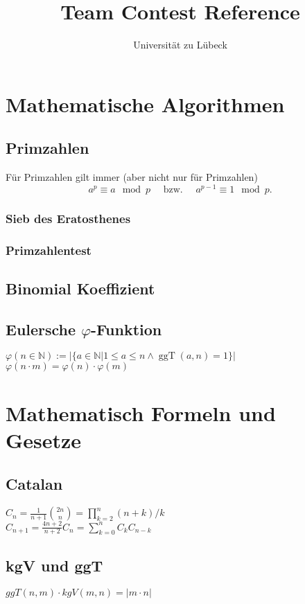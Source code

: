 \documentclass[10pt,a4paper,ngerman,oneside,
]{article}
\title{Team Contest Reference}
\author{Universität zu Lübeck}
\newcommand{\N}{\ensuremath{\mathbb{N}}}
\newcommand{\ggT}{\ensuremath{\operatorname{ggT}}}
\begin{document}
\lstset{basicstyle=\ttfamily\footnotesize,numbers=left,numberstyle=\tiny,tabsize=2,numbersep=5pt}
\maketitle
\thispagestyle{fancy}

\section{Mathematische Algorithmen}
\subsection{Primzahlen}
Für Primzahlen gilt immer (aber nicht nur für Primzahlen)
\[a^p\equiv a\mod p \quad\text{ bzw. }\quad a^{p-1}\equiv 1 \mod p.\]
\subsubsection{Sieb des Eratosthenes}

\subsubsection{Primzahlentest}

\subsection{Binomial Koeffizient}

\subsection{Eulersche $\varphi$-Funktion}
$\varphi(n\in\N):=|\{a\in\N |1\leq a \leq n \wedge \ggT (a,n)=1\}|$\\
$\varphi(n\cdot m)=\varphi(n)\cdot\varphi(m)$

\section{Mathematisch Formeln und Gesetze}
\subsection{Catalan}
$C_n = \frac1{n+1}\binom{2n}{n}=\prod_{k=2}^n (n+k)/k$\\
$C_{n+1} = \frac{4n+2}{n+2}C_n=\sum_{k=0}^{n}C_kC_{n-k}$
\subsection{kgV und ggT}
$ggT(n,m)\cdot kgV(m,n)=|m\cdot n|$
\end{document}
